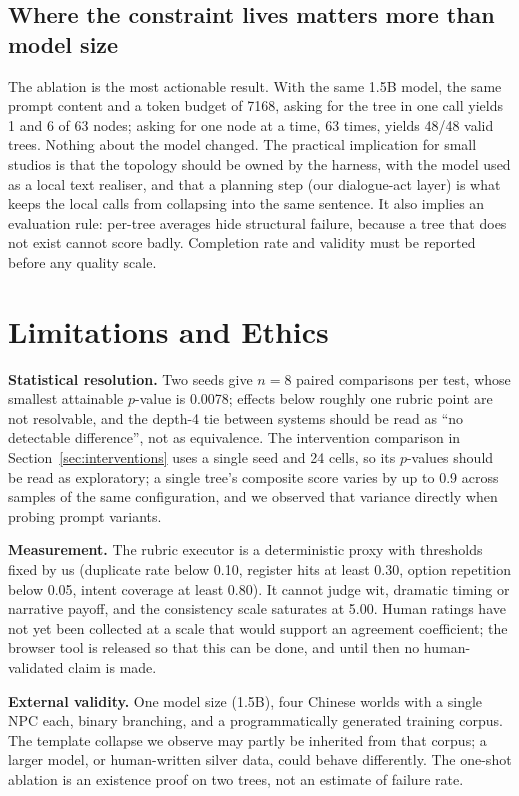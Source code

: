 \documentclass[conference]{IEEEtran}
\begin{document}
\subsection{Where the constraint lives matters more than model size}
The ablation is the most actionable result. With the same 1.5B model, the same prompt content and a
token budget of 7168, asking for the tree in one call yields 1 and 6 of 63 nodes; asking for one
node at a time, 63 times, yields 48/48 valid trees. Nothing about the model changed. The practical
implication for small studios is that the topology should be owned by the harness, with the model
used as a local text realiser, and that a planning step (our dialogue-act layer) is what keeps the
local calls from collapsing into the same sentence. It also implies an evaluation rule: per-tree
averages hide structural failure, because a tree that does not exist cannot score badly. Completion
rate and validity must be reported before any quality scale.

\section{Limitations and Ethics}
\label{sec:limits}
\textbf{Statistical resolution.} Two seeds give $n=8$ paired comparisons per test, whose smallest
attainable $p$-value is 0.0078; effects below roughly one rubric point are not resolvable, and the
depth-4 tie between systems should be read as ``no detectable difference'', not as equivalence. The
intervention comparison in Section~\ref{sec:interventions} uses a single seed and 24 cells, so its
$p$-values should be read as exploratory; a single tree's composite score varies by up to 0.9 across
samples of the same configuration, and we observed that variance directly when probing prompt variants.

\textbf{Measurement.} The rubric executor is a deterministic proxy with thresholds fixed by us
(duplicate rate below 0.10, register hits at least 0.30, option repetition below 0.05, intent
coverage at least 0.80). It cannot judge wit, dramatic timing or narrative payoff, and the
consistency scale saturates at 5.00. Human ratings have not yet been collected at a scale that
would support an agreement coefficient; the browser tool is released so that this can be done, and
until then no human-validated claim is made.

\textbf{External validity.} One model size (1.5B), four Chinese worlds with a single NPC each,
binary branching, and a programmatically generated training corpus. The template collapse we
observe may partly be inherited from that corpus; a larger model, or human-written silver data,
could behave differently. The one-shot ablation is an existence proof on two trees, not an
estimate of failure rate.
\end{document}
